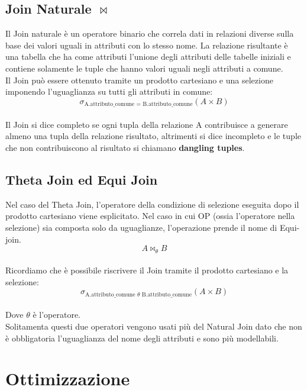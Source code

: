 \documentclass{report}
\begin{document}
\subsection{Join Naturale $\bowtie$}
Il Join naturale è un operatore binario che correla dati in relazioni diverse sulla base dei valori uguali in attributi con lo stesso nome. La relazione risultante è una tabella che ha come attributi l’unione degli attributi delle tabelle iniziali e contiene solamente le tuple che hanno valori uguali negli attributi a comune.\\
Il Join può essere ottenuto tramite un prodotto cartesiano e una selezione imponendo l’uguaglianza su tutti gli attributi in comune:\\
$$\sigma_{\text{A.attributo\_comune = B.attributo\_comune}}(A \times B)$$\\
Il Join si dice completo se ogni tupla della relazione A contribuisce a generare almeno una tupla della relazione risultato, altrimenti si dice incompleto e le tuple che non contribuiscono al risultato si chiamano \textbf{dangling tuples}.

\newpage
\subsection{Theta Join ed Equi Join}
Nel caso del Theta Join, l'operatore della condizione di selezione eseguita dopo il prodotto cartesiano viene esplicitato. Nel caso in cui OP (ossia l'operatore nella selezione) sia composta solo da uguaglianze, l’operazione prende il nome di Equi-join.\\
$$ A \bowtie_{\text{$\theta$}}B$$\\
Ricordiamo che è possibile riscrivere il Join tramite il prodotto cartesiano e la selezione:\\
$$\sigma_{\text{A.attributo\_comune $\theta$ B.attributo\_comune}}(A \times B)$$\\
Dove $\theta$ è l'operatore.\\
Solitamenta questi due operatori vengono usati più del Natural Join dato che non è obbligatoria l'uguaglianza del nome degli attributi e sono più modellabili.\\

\newpage
\section{Ottimizzazione}
\end{document}
